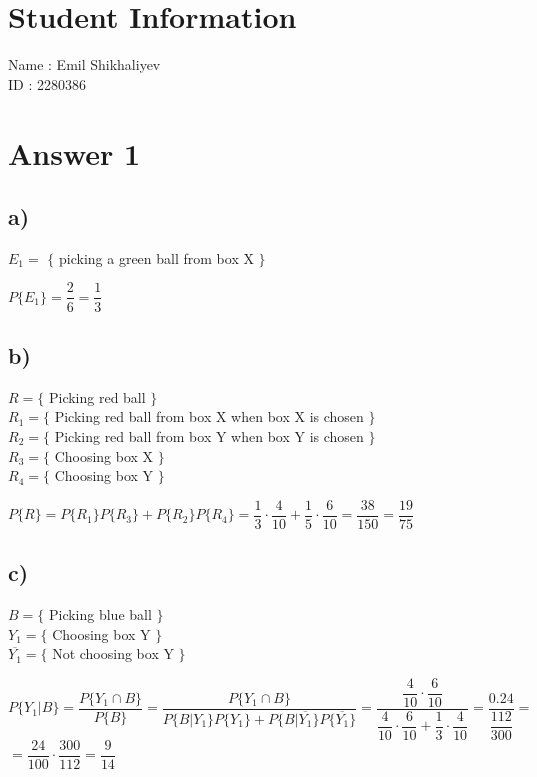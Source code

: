 \documentclass[12pt]{article}
\begin{document}
\section*{Student Information}

Name : Emil Shikhaliyev\\

ID : 2280386\\


\section*{Answer 1}
\subsection*{a)}
    $E_1 = $ $\{$ picking a green ball from box X $\}$ 
    \begin{center}
        $P \{ E_1 \} = \dfrac{2}{6} = \dfrac{1}{3}$   
    \end{center}
\subsection*{b)}
    $R = \{$ Picking red ball $\}$ \\
    $R_1 = \{$ Picking red ball from box X when box X is chosen $\}$ \\
    $R_2 = \{$ Picking red ball from box Y when box Y is chosen $\}$ \\
    $R_3 = \{$ Choosing box X $\}$ \\
    $R_4 = \{$ Choosing box Y $\}$ 
    \begin{center}
        $P\{R\} = P\{R_1\}P\{R_3\} + P\{R_2\}P\{R_4\} = \dfrac{1}{3} \cdot \dfrac{4}{10} + \dfrac{1}{5} \cdot \dfrac{6}{10} = \dfrac{38}{150} = \dfrac{19}{75}$
    \end{center}
\subsection*{c)}
$B = \{$ Picking blue ball $\}$ \\
$Y_1 = \{$ Choosing box Y $\}$ \\
$\overline{Y_1} = \{$ Not choosing box Y $\}$ 
\begin{center}
    $P\{Y_1|B\} = \dfrac{P\{ Y_1 \cap B\}}{P\{B\}} = \dfrac{P\{ Y_1 \cap B\}}{P\{B|Y_1\}P\{Y_1\} + P\{B|\overline{Y_1}\}P\{\overline{Y_1}\}} = \dfrac{\dfrac{4}{10} \cdot \dfrac{6}{10}}{\dfrac{4}{10}\cdot\dfrac{6}{10} + \dfrac{1}{3}\cdot\dfrac{4}{10}} = \dfrac{ 0.24}{\dfrac{112}{300}} =$ \\ $= \dfrac{24}{100}\cdot \dfrac{300}{112} = \dfrac{9}{14}$
\end{center}
\end{document}
